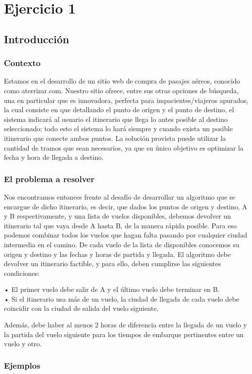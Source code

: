 \section{Ejercicio 1}
\subsection{Introducción}
\indent \subsubsection{Contexto}
Estamos en el desarrollo de un sitio web de compra de pasajes aéreos, conocido como aterrizar.com. Nuestro sitio ofrece, entre sus otras opciones de búsqueda, una en particular que es innovadora, perfecta para impacientes/viajeros apurados, la cual consiste en que detallando el punto de origen y el punto de destino, el sistema indicará al usuario el itinerario que llega lo antes posible al destino seleccionado; todo esto el sistema lo hará siempre y cuando exista un posible itinerario que conecte ambos puntos.
La solución provista puede utilizar la cantidad de tramos que sean necesarios, ya que su único objetivo es optimizar la fecha y hora de llegada a destino.
\indent \subsubsection{El problema a resolver}

Nos encontramos entonces frente al desafío de desarrollar un algoritmo que se encargue de dicho itinerario, es decir, que dados los puntos de origen y destino, A y B respectivamente, y una lista de vuelos disponibles, debemos devolver un itinerario tal que vaya desde A hasta B, de la manera rápida posible. Para eso podemos combinar todos los vuelos que hagan falta pasando por cualquier ciudad intermedia en el camino.
De cada vuelo de la lista de disponibles conocemos su origen y destino y las fechas y horas de partida y llegada.
El algoritmo debe devolver un itinerario factible, y para ello, deben cumplirse las siguientes condiciones:

\indent• El primer vuelo debe salir de A y el último vuelo debe terminar en B.\\
\indent• Si el itinerario usa más de un vuelo, la ciudad de llegada de cada vuelo debe coincidir con la ciudad de salida del vuelo siguiente.

Además, debe haber al menos 2 horas de diferencia entre la llegada de un vuelo y la partida del vuelo siguiente para los tiempos de embarque pertinentes entre un vuelo y otro.
\indent \subsubsection{Ejemplos}


